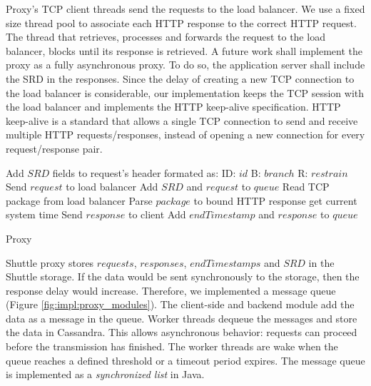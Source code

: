 Proxy's TCP client threads send the requests to the load balancer. We use a fixed size thread pool to associate each \ac{HTTP} response to the correct \ac{HTTP} request. The thread that retrieves, processes and forwards the request to the load balancer, blocks until its response is retrieved. A future work shall implement the proxy as a fully asynchronous proxy. To do so, the application server shall include the \ac{SRD} in the responses. Since the delay of creating a new TCP connection to the load balancer is considerable, our implementation keeps the TCP session with the load balancer and implements the \ac{HTTP} keep-alive specification. \ac{HTTP} keep-alive is a standard that allows a single TCP connection to send and receive multiple \ac{HTTP} requests/responses, instead of opening a new connection for every request/response pair. 

\begin{algorithm}
	\DontPrintSemicolon{}
		\;
		\BlankLine 
		\;
		\;
		\; 
		Add $SRD$ fields to request's header formated as: \newline ID: $id$ \newline B: $branch$ \newline R: $restrain$\;
		Send $request$ to load balancer\;
		Add $SRD$ and $request$ to $queue$\;
		 {Read TCP package from load balancer}\;
		 {Parse $package$ to bound \ac{HTTP} response}\;
		 {get current system time}\;
		Send $response$ to client\;
		Add $endTimestamp$ and $response$ to $queue$\;
  	\caption{Proxy}
	\label{code:proxy_service}
\end{algorithm}



Shuttle proxy stores $requests$, $responses$, $endTimestamps$ and $SRD$ in the Shuttle storage. If the data would be sent synchronously to the storage, then the response delay would increase. Therefore, we implemented a message queue (Figure \ref{fig:impl:proxy_modules}). The client-side and backend module add the data as a message in the queue. Worker threads dequeue the messages and store the data in Cassandra. This allows asynchronous behavior: requests can proceed before the transmission has finished. The worker threads are wake when the queue reaches a defined threshold or a timeout period expires. The message queue is implemented as a \emph{synchronized list} in Java.


